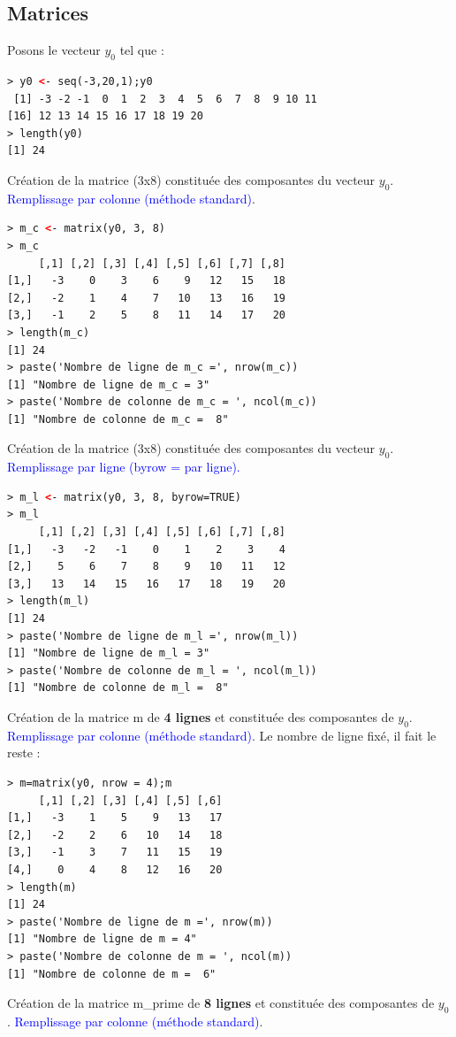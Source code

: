 \subsection{Matrices}
Posons le vecteur $y_{0}$ tel que : 
\begin{lstlisting}[language=html]
> y0 <- seq(-3,20,1);y0
 [1] -3 -2 -1  0  1  2  3  4  5  6  7  8  9 10 11
[16] 12 13 14 15 16 17 18 19 20
> length(y0)
[1] 24
\end{lstlisting}
Création de la matrice (3x8) constituée des composantes du vecteur $y_{0}$. \textcolor{blue}{Remplissage par colonne (méthode standard)}.
\begin{lstlisting}[language=html]
> m_c <- matrix(y0, 3, 8)
> m_c
     [,1] [,2] [,3] [,4] [,5] [,6] [,7] [,8]
[1,]   -3    0    3    6    9   12   15   18
[2,]   -2    1    4    7   10   13   16   19
[3,]   -1    2    5    8   11   14   17   20
> length(m_c)
[1] 24
> paste('Nombre de ligne de m_c =', nrow(m_c))
[1] "Nombre de ligne de m_c = 3"
> paste('Nombre de colonne de m_c = ', ncol(m_c))
[1] "Nombre de colonne de m_c =  8"
\end{lstlisting}
Création de la matrice (3x8) constituée des composantes du vecteur $y_{0}$. \textcolor{blue}{Remplissage par ligne (byrow = par ligne).}
\begin{lstlisting}[language=html]
> m_l <- matrix(y0, 3, 8, byrow=TRUE)
> m_l
     [,1] [,2] [,3] [,4] [,5] [,6] [,7] [,8]
[1,]   -3   -2   -1    0    1    2    3    4
[2,]    5    6    7    8    9   10   11   12
[3,]   13   14   15   16   17   18   19   20
> length(m_l)
[1] 24
> paste('Nombre de ligne de m_l =', nrow(m_l))
[1] "Nombre de ligne de m_l = 3"
> paste('Nombre de colonne de m_l = ', ncol(m_l))
[1] "Nombre de colonne de m_l =  8"
\end{lstlisting}
Création de la matrice m de \textbf{4 lignes} et constituée des composantes de $y_{0}$. \textcolor{blue}{Remplissage par colonne (méthode standard)}.\newline
Le nombre de ligne fixé, il fait le reste : 
\begin{lstlisting}[language=html]
> m=matrix(y0, nrow = 4);m
     [,1] [,2] [,3] [,4] [,5] [,6]
[1,]   -3    1    5    9   13   17
[2,]   -2    2    6   10   14   18
[3,]   -1    3    7   11   15   19
[4,]    0    4    8   12   16   20
> length(m)
[1] 24
> paste('Nombre de ligne de m =', nrow(m))
[1] "Nombre de ligne de m = 4"
> paste('Nombre de colonne de m = ', ncol(m))
[1] "Nombre de colonne de m =  6"
\end{lstlisting}
Création de la matrice m\_prime de \textbf{8 lignes} et constituée des composantes de $y_{0}$. \textcolor{blue}{Remplissage par colonne (méthode standard)}.
